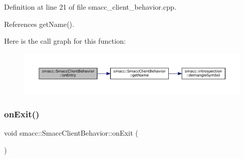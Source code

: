 Definition at line 21 of file smacc\+\_\+client\+\_\+behavior.\+cpp.



References get\+Name().


Here is the call graph for this function\+:
\nopagebreak
\begin{figure}[H]
\begin{center}
\leavevmode
\includegraphics[width=350pt]{classsmacc_1_1SmaccClientBehavior_a7962382f93987c720ad432fef55b123f_cgraph}
\end{center}
\end{figure}
\mbox{\label{classsmacc_1_1SmaccClientBehavior_ac0cd72d42bd00425362a97c9803ecce5}} 
\subsubsection{\texorpdfstring{on\+Exit()}{onExit()}}
{\footnotesize\ttfamily void smacc\+::\+Smacc\+Client\+Behavior\+::on\+Exit (\begin{DoxyParamCaption}{ }\end{DoxyParamCaption})\hspace{0.3cm}{\ttfamily [virtual]}}




